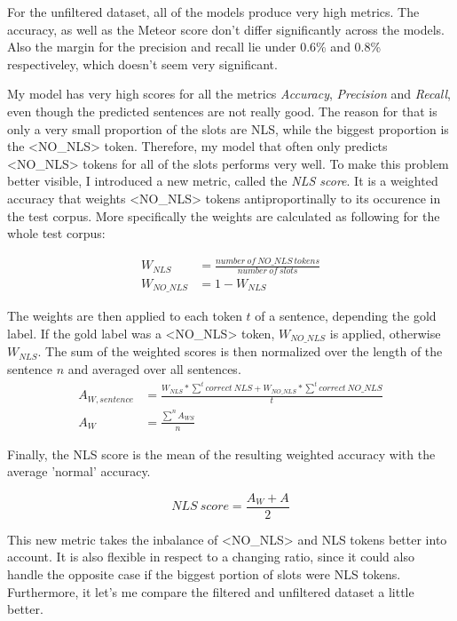 \documentclass[
	11pt, %
]{fphw}
\begin{document}
For the unfiltered dataset, all of the models produce very high metrics. The accuracy, as well as the Meteor score don't differ significantly across the models. Also the margin for the precision and recall lie under 0.6\% and 0.8\% respectiveley, which doesn't seem very significant.

My model has very high scores for all the metrics \emph{Accuracy}, \emph{Precision} and \emph{Recall}, even though the predicted sentences are not really good. The reason for that is only a very small proportion of the slots are NLS, while the biggest proportion is the <NO\_NLS> token. Therefore, my model that often only predicts <NO\_NLS> tokens for all of the slots performs very well. To make this problem better visible, I introduced a new metric, called the \emph{NLS score}. It is a weighted accuracy that weights <NO\_NLS> tokens antiproportinally to its occurence in the test corpus. More specifically the weights are calculated as following for the whole test corpus:

\begin{align}
    W_{NLS}     & = \frac{number\ of\ NO\_NLS\ tokens}{number\ of\ slots} \\
    W_{NO\_NLS} & = 1 - W_{NLS}
\end{align}

The weights are then applied to each token $t$ of a sentence, depending the gold label. If the gold label was a <NO\_NLS> token, $W_{NO\_NLS}$ is applied, otherwise $W_{NLS}$. The sum of the weighted scores is then normalized over the length of the sentence $n$ and averaged over all sentences.
\begin{align}
    A_{W,sentence} & = \frac{W_{NLS} * \sum_{}^{t}{correct\ NLS} + W_{NO\_NLS} *\sum_{}^{t}{correct\ NO\_NLS}}{t} \\
    A_W            & = \frac{\sum_{}^{n}A_{WS}}{n}
\end{align}

Finally, the NLS score is the mean of the resulting weighted accuracy with the average 'normal' accuracy.

\begin{equation}
    NLS\ score = \frac{A_W + A}{2}
\end{equation}

This new metric takes the inbalance of <NO\_NLS> and NLS tokens better into account. It is also flexible in respect to a changing ratio, since it could also handle the opposite case if the biggest portion of slots were NLS tokens. Furthermore, it let's me compare the filtered and unfiltered dataset a little better.
\end{document}
